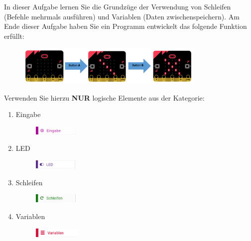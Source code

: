 \documentclass{hmLab}
\begin{document}
\noindent In dieser Aufgabe lernen Sie die Grundzüge der Verwendung von Schleifen (Befehle mehrmals ausführen) und Variablen (Daten zwischenspeichern).
Am Ende dieser Aufgabe haben Sie ein Programm entwickelt das folgende Funktion erfüllt:
%
\begin{figure}[h!]
	\centering
	\includegraphics[width=0.8\textwidth]{microbit-X}
\end{figure}
%
Verwenden Sie hierzu \textbf{NUR} logische Elemente aus der Kategorie:
%
\begin{enumerate}[label=$\bullet$]
	\item Eingabe 
	\begin{figure}[h!]
		\centering
		\includegraphics[width=0.2\textwidth]{input}
	\end{figure}
	\item LED
	\begin{figure}[h!]
		\centering
		\includegraphics[width=0.2\textwidth]{led}
	\end{figure}
	\item Schleifen
	\begin{figure}[h!]
		\centering
		\includegraphics[width=0.2\textwidth]{loop}
	\end{figure}
	\item Variablen
	\begin{figure}[h!]
		\centering
		\includegraphics[width=0.21\textwidth]{variables}
	\end{figure}
\end{enumerate}
\end{document}
